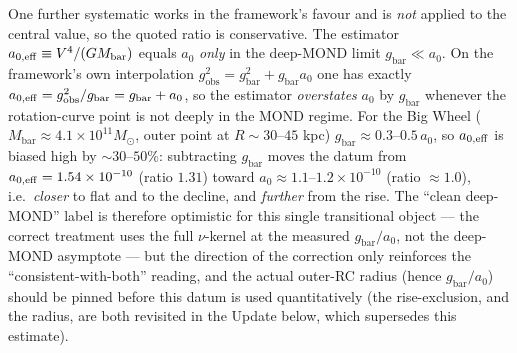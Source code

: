 \documentclass[
]{article}
\begin{document}
One further systematic works in the framework's favour and is \emph{not}
applied to the central value, so the quoted ratio is conservative. The
estimator \(a_{0,\rm eff}\equiv V^4/(GM_\mathrm{bar})\) equals \(a_0\)
\emph{only} in the deep-MOND limit \(g_\mathrm{bar}\ll a_0\). On the
framework's own interpolation
\(g_\mathrm{obs}^2=g_\mathrm{bar}^2+g_\mathrm{bar}a_0\) one has exactly
\(a_{0,\rm eff}=g_\mathrm{obs}^2/g_\mathrm{bar}=g_\mathrm{bar}+a_0\), so the
estimator \emph{overstates} \(a_0\) by \(g_\mathrm{bar}\) whenever the
rotation-curve point is not deeply in the MOND regime. For the Big Wheel
(\(M_\mathrm{bar}\approx4.1\times10^{11}M_\odot\), outer point at
\(R\sim30\)--\(45\) kpc) \(g_\mathrm{bar}\approx0.3\)--\(0.5\,a_0\), so
\(a_{0,\rm eff}\) is biased high by \(\sim30\)--\(50\%\): subtracting
\(g_\mathrm{bar}\) moves the datum from
\(a_{0,\rm eff}=1.54\times10^{-10}\) (ratio \(1.31\)) toward
\(a_0\approx1.1\)--\(1.2\times10^{-10}\) (ratio \(\approx1.0\)),
i.e.~\emph{closer} to flat and to the decline, and \emph{further} from
the rise. The ``clean deep-MOND'' label is therefore optimistic for this
single transitional object --- the correct treatment uses the full
\(\nu\)-kernel at the measured \(g_\mathrm{bar}/a_0\), not the deep-MOND
asymptote --- but the direction of the correction only reinforces the
``consistent-with-both'' reading, and the actual outer-RC radius (hence
\(g_\mathrm{bar}/a_0\)) should be pinned before this datum is used
quantitatively (the rise-exclusion, and the radius, are both revisited
in the Update below, which supersedes this estimate).
\end{document}
